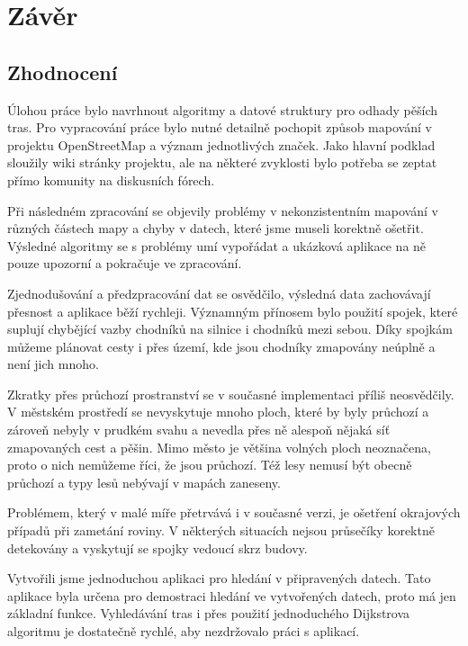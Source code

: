 \chapter*{Závěr}

\section*{Zhodnocení}
Úlohou práce bylo navrhnout algoritmy a datové struktury pro odhady pěších tras.
Pro vypracování práce bylo nutné detailně pochopit způsob mapování v projektu
OpenStreetMap a význam jednotlivých značek. Jako hlavní podklad sloužily wiki
stránky projektu, ale na některé zvyklosti bylo potřeba se zeptat přímo komunity na
diskusních fórech. 

Při následném zpracování se objevily problémy v nekonzistentním mapování v
různých částech mapy a chyby v datech, které jsme museli korektně ošetřit.
Výsledné algoritmy se s problémy umí vypořádat a ukázková aplikace na ně pouze
upozorní a pokračuje ve zpracování. 

Zjednodušování a předzpracování dat se osvědčilo, výsledná data zachovávají
přesnost a aplikace běží rychleji. Významným přínosem bylo použití spojek, které
suplují chybějící vazby chodníků na silnice i chodníků mezi sebou. Díky spojkám
můžeme plánovat cesty i přes území, kde jsou chodníky zmapovány neúplně a není
jich mnoho. 

Zkratky přes průchozí prostranství se v současné implementaci příliš neosvědčily.
V městském prostředí se nevyskytuje mnoho ploch, které by byly průchozí a
zároveň nebyly v prudkém svahu a nevedla přes ně alespoň nějaká síť
zmapovaných cest a pěšin. Mimo město je většina volných ploch neoznačena, proto o
nich nemůžeme říci, že jsou průchozí. Též lesy nemusí být obecně průchozí a typy lesů
nebývají v mapách zaneseny. 

Problémem, který v malé míře přetrvává i v současné verzi, je ošetření
okrajových případů při zametání roviny. V některých situacích nejsou
průsečíky korektně detekovány a vyskytují se spojky vedoucí skrz budovy.  

Vytvořili jsme jednoduchou aplikaci pro hledání v připravených datech. Tato
aplikace byla určena pro demostraci hledání ve vytvořených datech, proto má jen
základní funkce. Vyhledávání tras i přes použití jednoduchého Dijkstrova
algoritmu je dostatečně rychlé, aby nezdržovalo práci s aplikací. 

